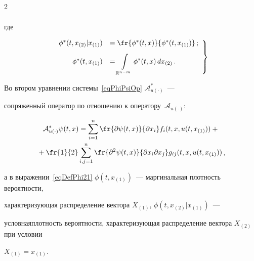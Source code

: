 \begin{multicols}{2}
\begin{multline}
\end{multline}


где


\begin{equation}


\label{eqDefPhi21}


\left.


\begin{array}{rl}


  \phi^*(t,x_{(2)} | x_{(1)}) &= 


  \fr{\phi^*(t,x)}{\phi^*(t,x_{(1)})}\,; \\[9pt]


  \phi^*(t,x_{(1)}) &= \displaystyle\int\limits_{\mathbb{R}^{n-m}} {\phi^*(t,x) \,dx_{(2)}}\,.


  \end{array}


  \right \}


\end{equation}





Во втором уравнении системы~\eqref{eqPhiPsiOp} $\mathcal{A}^*_{u(\cdot)}$~--- 


сопряженный оператор по отношению к оператору~$\mathcal{A}_{u(\cdot)}$:


\begin{multline*}




  \mathcal{A}^*_{u(\cdot)} \psi(t,x) = \sum\limits_{i = 1}^n 


  \fr{\partial \psi(t,x)}{\partial x_i} f_i(t,x,u(t,x_{(1)})) +{}\\


  {}+ \fr{1}{2} \sum\limits_{i,j = 1}^n 


  \fr{\partial^2 \psi(t,x)}{\partial x_i \partial x_j} g_{ij}(t,x,u(t,x_{(1)}))\,,


\end{multline*}


а в выражении~\eqref{eqDefPhi21} $\phi(t,x_{(1)})$~--- маргинальная плотность вероятности, 


характеризующая рас\-пре\-деление вектора $X_{(1)}$, $\phi(t,x_{(2)} | x_{(1)})$~--- 


условная\linebreak плотность вероятности, характеризующая распределение вектора $X_{(2)}$ при условии 


${X_{(1)} = x_{(1)}}$.






\end{multicols}
